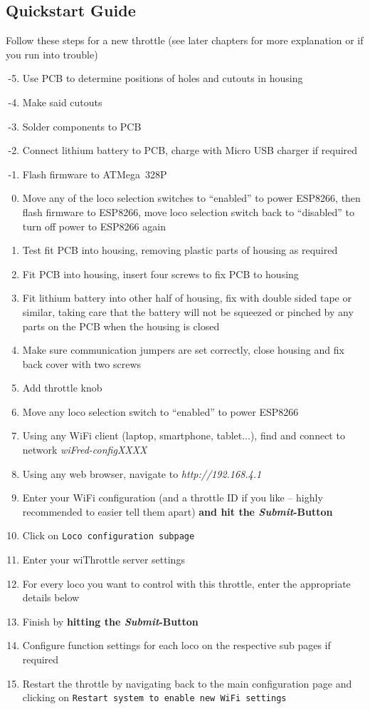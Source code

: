 \documentclass[11pt,a4paper]{scrartcl}
\begin{document}
\subsection{Quickstart Guide}

Follow these steps for a new throttle (see later chapters for more explanation or if you run into trouble)

\begin{enumerate}
\setcounter{enumi}{-6}
\item Use PCB to determine positions of holes and cutouts in housing
\item Make said cutouts
\item Solder components to PCB
\item Connect lithium battery to PCB, charge with Micro USB charger if required
\item Flash firmware to ATMega~328P
\item Move any of the loco selection switches to ``enabled'' to power ESP8266, then flash firmware to ESP8266, move loco selection switch back to ``disabled'' to turn off power to ESP8266 again
\item Test fit PCB into housing, removing plastic parts of housing as required
\item Fit PCB into housing, insert four screws to fix PCB to housing
\item Fit lithium battery into other half of housing, fix with double sided tape or similar, taking care that the battery will not be squeezed or pinched by any parts on the PCB when the housing is closed
\item Make sure communication jumpers are set correctly, close housing and fix back cover with two screws
\item Add throttle knob
\item Move any loco selection switch to ``enabled'' to power ESP8266
\item Using any WiFi client (laptop, smartphone, tablet...), find and connect to network \textit{wiFred-configXXXX}
\item Using any web browser, navigate to \textit{http://192.168.4.1}
\item Enter your WiFi configuration (and a throttle ID if you like -- highly recommended to easier tell them apart) \textbf{and hit the \textit{Submit}-Button}
\item Click on \texttt{Loco configuration subpage}
\item Enter your wiThrottle server settings
\item For every loco you want to control with this throttle, enter the appropriate details below
\item Finish by \textbf{hitting the \textit{Submit}-Button}
\item Configure function settings for each loco on the respective sub pages if required
\item Restart the throttle by navigating back to the main configuration page and clicking on \texttt{Restart system to enable new WiFi settings}
\end{enumerate}
\end{document}
